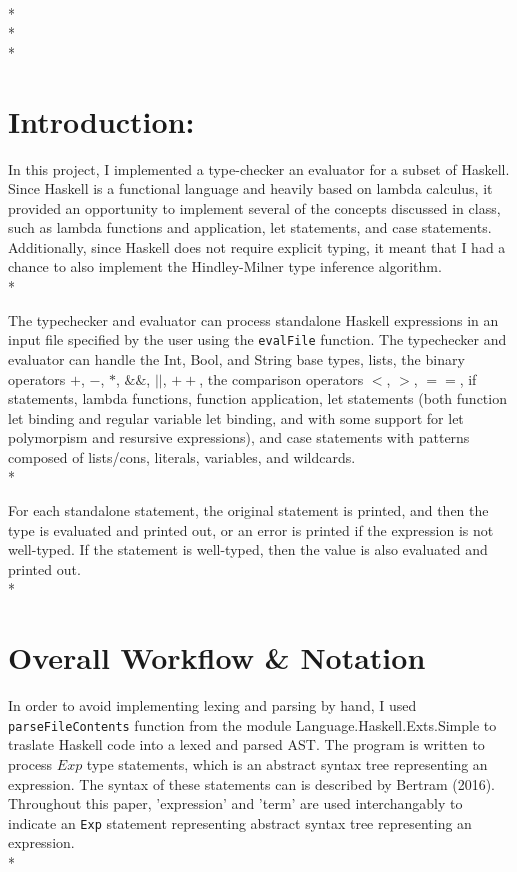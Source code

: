 \documentclass[11pt]{article}
\begin{document}
 \\*
 \\*
\\*

\section*{Introduction:}

In this project, I implemented a type-checker an evaluator for a subset of Haskell. Since Haskell is a functional language 
and heavily based on lambda calculus, it provided an opportunity to implement several of the concepts discussed 
in class, such as lambda functions and application, let statements, and case statements.  Additionally, since Haskell does not require 
explicit typing, it meant that I had a chance to also implement the Hindley-Milner type inference algorithm.\\*

The typechecker and evaluator can process standalone Haskell expressions in an input file specified by the user using the \verb|evalFile| function.  The typechecker and evaluator can handle the Int, Bool, and String base types, lists, the binary operators $+$, $-$, $*$, $\&\&$, $||$, $++$, the comparison operators $<$, $>$, $==$, if statements, lambda functions, function application, let statements (both function let binding and regular variable let binding, and with some support for let polymorpism and resursive expressions), and case statements with patterns composed of lists/cons, literals, variables, and wildcards.\\*  

For each standalone statement, the original statement is printed, and then the type is evaluated and printed out, or an error is printed if the expression is not well-typed. If the statement is well-typed, then the value is also evaluated and printed out.\\*

\section*{Overall Workflow \& Notation}

In order to avoid implementing lexing and parsing by hand, I used \verb|parseFileContents| function from 
the module Language.Haskell.Exts.Simple to traslate Haskell code into a lexed and parsed AST. The program is written to process $Exp$ type statements, which is an abstract syntax tree representing an expression. The syntax of these statements can is described by Bertram (2016). Throughout this paper, 'expression' and 'term' are used interchangably to indicate an \verb|Exp| statement representing abstract syntax tree representing an expression.\\*
\end{document}
